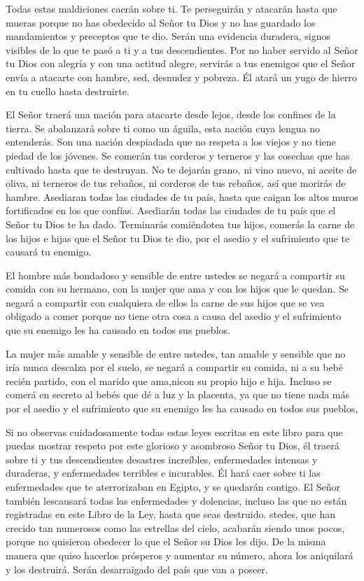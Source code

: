  Todas estas maldiciones caerán sobre ti. Te perseguirán y
atacarán hasta que mueras porque no has obedecido al Señor tu Dios y no
has guardado los mandamientos y preceptos que te dio. 
Serán una evidencia duradera, signos visibles de lo que te pasó a ti y a
tus descendientes.  Por no haber servido al Señor tu Dios
con alegría y con una actitud alegre,  servirás a tus
enemigos que el Señor envía a atacarte con hambre, sed, desnudez y
pobreza. Él atará un yugo de hierro en tu cuello hasta destruirte.

 El Señor traerá una nación para atacarte desde lejos,
desde los confines de la tierra. Se abalanzará sobre ti como un águila,
esta nación cuya lengua no entenderás.  Son una nación
despiadada que no respeta a los viejos y no tiene piedad de los jóvenes.
 Se comerán tus corderos y terneros y las cosechas que has
cultivado hasta que te destruyan. No te dejarán grano, ni vino nuevo, ni
aceite de oliva, ni terneros de tus rebaños, ni corderos de tus rebaños,
así que morirás de hambre.  Asediaran todas las ciudades de
tu país, hasta que caigan los altos muros fortificados en los que
confías. Asediarán todas las ciudades de tu país que el Señor tu Dios te
ha dado.  Terminarás comiéndotea tus hijos, comerás la
carne de los hijos e hijas que el Señor tu Dios te dio, por el asedio y
el sufrimiento que te causará tu enemigo.

 El hombre más bondadoso y sensible de entre ustedes se
negará a compartir su comida con su hermano, con la mujer que ama y con
los hijos que le quedan.  Se negará a compartir con
cualquiera de ellos la carne de sus hijos que se vea obligado a comer
porque no tiene otra cosa a causa del asedio y el sufrimiento que su
enemigo les ha causado en todos sus pueblos.

 La mujer más amable y sensible de entre ustedes, tan
amable y sensible que no iría nunca descalza por el suelo, se negará a
compartir su comida, ni a su bebé recién partido, con el marido que
ama,nicon su propio hijo e hija.  Incluso se comerá en
secreto al bebés que dé a luz y la placenta, ya que no tiene nada más
por el asedio y el sufrimiento que su enemigo les ha causado en todos
sus pueblos,

 Si no observas cuidadosamente todas estas leyes escritas
en este libro para que puedas mostrar respeto por este glorioso y
asombroso Señor tu Dios,  él traerá sobre ti y tus
descendientes desastres increíbles, enfermedades intensas y duraderas, y
enfermedades terribles e incurables.  Él hará caer sobre ti
las enfermedades que te aterrorizaban en Egipto, y se quedarán contigo.
 El Señor también lescausará todas las enfermedades y
dolencias, incluso las que no están registradas en este Libro de la Ley,
hasta que seas destruido.  stedes, que han crecido tan
numerosos como las estrellas del cielo, acabarán siendo unos pocos,
porque no quisieron obedecer lo que el Señor su Dios les dijo.
 De la misma manera que quiso hacerlos prósperos y aumentar
su número, ahora los aniquilará y los destruirá. Serán desarraigado del
país que van a poseer.

